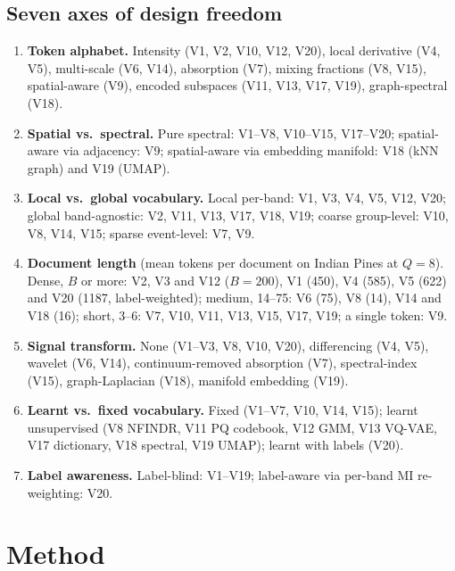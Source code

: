 \documentclass[journal,a4paper,10pt]{IEEEtran}
\begin{document}
\subsection{Seven axes of design freedom}
\label{subsec:design-axes}
\begin{enumerate}
  \item \textbf{Token alphabet.} Intensity (V1, V2, V10, V12, V20),
    local derivative (V4, V5), multi-scale (V6, V14), absorption (V7),
    mixing fractions (V8, V15), spatial-aware (V9), encoded subspaces
    (V11, V13, V17, V19), graph-spectral (V18).
  \item \textbf{Spatial vs.\ spectral.} Pure spectral: V1--V8, V10--V15,
    V17--V20; spatial-aware via adjacency: V9; spatial-aware via
    embedding manifold: V18 (kNN graph) and V19 (UMAP).
  \item \textbf{Local vs.\ global vocabulary.} Local per-band: V1,
    V3, V4, V5, V12, V20; global band-agnostic: V2, V11, V13, V17,
    V18, V19; coarse group-level: V10, V8, V14, V15; sparse
    event-level: V7, V9.
  \item \textbf{Document length} (mean tokens per document on Indian
    Pines at $Q = 8$). Dense, $B$ or more: V2, V3 and V12 ($B = 200$),
    V1 (450), V4 (585), V5 (622) and V20 (1187, label-weighted); medium,
    14--75: V6 (75), V8 (14), V14 and V18 (16); short, 3--6: V7, V10,
    V11, V13, V15, V17, V19; a single token: V9.
  \item \textbf{Signal transform.} None (V1--V3, V8, V10, V20),
    differencing (V4, V5), wavelet (V6, V14), continuum-removed
    absorption (V7), spectral-index (V15), graph-Laplacian (V18),
    manifold embedding (V19).
  \item \textbf{Learnt vs.\ fixed vocabulary.} Fixed (V1--V7,
    V10, V14, V15); learnt unsupervised (V8 NFINDR, V11 PQ codebook,
    V12 GMM, V13 VQ-VAE, V17 dictionary, V18 spectral, V19 UMAP);
    learnt with labels (V20).
  \item \textbf{Label awareness.} Label-blind: V1--V19; label-aware
    via per-band MI re-weighting: V20.
\end{enumerate}

\section{Method}\label{sec:method}
\end{document}

